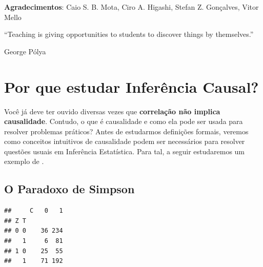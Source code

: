 



\maketitle

\vspace{20mm}

\textbf{Agradecimentos}: Caio S. B. Mota, Ciro A. Higashi, Stefan Z. Gonçalves, Vitor Mello

\newpage

\epigraph{
``Teaching is giving opportunities to students to discover things by themselves.''
}
{George P\'olya}
 
 
\newpage
 
\tableofcontents
  
\newpage




\chapter{Por que estudar Inferência Causal?}
\label{cap:intro}

Você já deve ter ouvido diversas vezes que
\textbf{correlação não implica causalidade}. Contudo,
o que é causalidade e como 
ela pode ser usada para resolver problemas práticos?
Antes de estudarmos definições formais,
veremos como conceitos intuitivos de causalidade
podem ser necessários para resolver questões
usuais em Inferência Estatística.
Para tal, a seguir estudaremos um exemplo de \citet{Glymour2016}.

\section{O Paradoxo de Simpson}
\label{sec:simpson}

\begin{table}
\begin{knitrout}
\color{fgcolor}\begin{kframe}
\begin{verbatim}
##     C   0   1
## Z T          
## 0 0    36 234
##   1     6  81
## 1 0    25  55
##   1    71 192
\end{verbatim}
\end{kframe}
\end{knitrout}
 \caption{Frequência conjunta 
 das variáveis binárias $T$, $C$, e $Z$.}
 \label{tabs:simpson}
\end{table}

